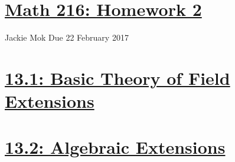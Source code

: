 \documentclass{article}
\begin{document}
\section*{\underline{Math 216: Homework 2}}
Jackie Mok
\newline Due 22 February 2017

\section*{\underline{13.1: Basic Theory of Field Extensions}}





\section*{\underline{13.2: Algebraic Extensions}}








\end{document}
